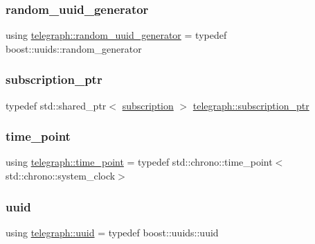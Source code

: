 \subsubsection{\texorpdfstring{random\+\_\+uuid\+\_\+generator}{random\_uuid\_generator}}
{\footnotesize\ttfamily using \hyperlink{namespacetelegraph_a201160a557b56b424ce605263acdb0ae}{telegraph\+::random\+\_\+uuid\+\_\+generator} = typedef boost\+::uuids\+::random\+\_\+generator}

\mbox{\label{namespacetelegraph_a58641aa5b1a2cbdb0431916a87069f64}} 
\subsubsection{\texorpdfstring{subscription\+\_\+ptr}{subscription\_ptr}}
{\footnotesize\ttfamily typedef std\+::shared\+\_\+ptr$<$ \hyperlink{classtelegraph_1_1subscription}{subscription} $>$ \hyperlink{namespacetelegraph_a58641aa5b1a2cbdb0431916a87069f64}{telegraph\+::subscription\+\_\+ptr}}

\mbox{\label{namespacetelegraph_a0f1714084e0d249aa06f757c9159c0ca}} 
\subsubsection{\texorpdfstring{time\+\_\+point}{time\_point}}
{\footnotesize\ttfamily using \hyperlink{namespacetelegraph_a0f1714084e0d249aa06f757c9159c0ca}{telegraph\+::time\+\_\+point} = typedef std\+::chrono\+::time\+\_\+point$<$std\+::chrono\+::system\+\_\+clock$>$}

\mbox{\label{namespacetelegraph_a51ee91d7eaeef067f7ccac2b170e5d59}} 
\subsubsection{\texorpdfstring{uuid}{uuid}}
{\footnotesize\ttfamily using \hyperlink{namespacetelegraph_a51ee91d7eaeef067f7ccac2b170e5d59}{telegraph\+::uuid} = typedef boost\+::uuids\+::uuid}



